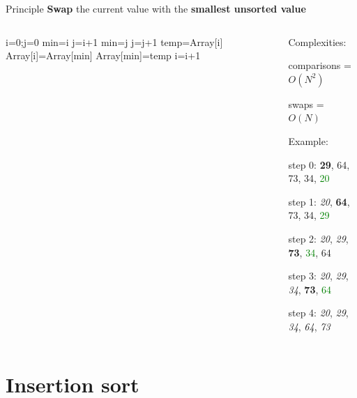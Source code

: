 \documentclass{beamer}[10pt, usepdftitle=false, handout]
\begin{document}
	\begin{frame}
	
	\begin{block}{Principle}
	\textbf{Swap} the current value with the \textbf{smallest unsorted value} 
	\end{block}	
	
	\begin{columns}[c]
	\begin{center}    
    \scalebox{0.75} {
    \begin{algorithm}[H]
    	i=0;j=0\;
		 {
			min=i\;
			j=i+1\;
			 {
				 {
					min=j\;
				}
				j=j+1\;
			}
			temp=Array[i]\;
			Array[i]=Array[min]\;
			Array[min]=temp\;
			i=i+1\;
		}	 
	\end{algorithm}	
	}
	\end{center}			
	
	\begin{center}
	Complexities:
	
	comparisons = $O(N^2)$	
	
	swaps = $O(N)$
	
	\vspace*{1em}
	Example:
	\vspace*{1em}	
	
	step 0: \textbf{29}, 64, 73, 34, \textcolor{green}{20}
	
	step 1: \textit{20}, \textbf{64}, 73, 34, \textcolor{green}{29}
	
	step 2: \textit{20}, \textit{29}, \textbf{73}, \textcolor{green}{34}, 64
	
	step 3: \textit{20}, \textit{29}, \textit{34}, \textbf{73}, \textcolor{green}{64}
	
	step 4: \textit{20}, \textit{29}, \textit{34}, \textit{64}, \textit{73} 		
	
	\end{center}	
		
	\end{columns}
		
	\end{frame}	
	
	\section {Insertion sort}
	
\end{document}
